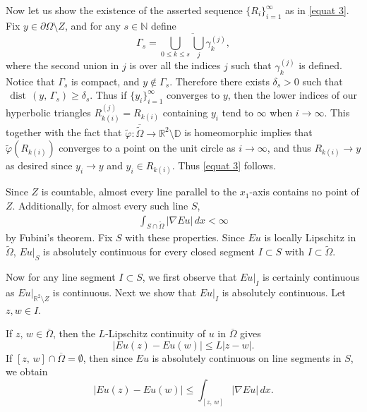 \documentclass[reqno,11pt]{amsart}
\def\dist{{\mathop\mathrm{\,dist\,}}}
\def\wz{\widetilde}
\numberwithin{equation}{section}
\theoremstyle{remark}
\begin{document}
Now let us show the existence of the asserted sequence $\{R_i\}_{i=1}^{\infty}$ as in \eqref{equat 3}. Fix $y\in \partial\Omega\setminus Z$, and for
any $s\in \mathbb N$ define
\begin{equation}\label{curve family}
\Gamma_s=\overline{\bigcup_{0\le k\le s} \bigcup_ j\gamma_k^{(j)}},
\end{equation}
where the second union in $j$ is over all the indices $j$ such that 
$\gamma_k^{(j)}$ is defined. Notice that $\Gamma_s$ is compact, 
and $y\not\in\Gamma_s$.
Therefore there exists $\delta_s>0$ such that $\dist(y,\,\Gamma_s)\ge\delta_s$. 
Thus if $\{y_i\}_{i=1}^{\infty}$ converges to $y$, then the lower indices 
of our hyperbolic triangles $R_{k(i)}^{(j)}=R_{k(i)}$ containing $y_i$ tend to 
$\infty$ when $i\to \infty.$  
This together with the fact that $\wz \varphi\colon \overline{\wz \Omega} 
\to \mathbb R^2\setminus \mathbb D$ is homeomorphic implies that $\wz \varphi(R_{k(i)})$ converges to a point on the unit circle  as $i\to \infty$, and thus $R_{k(i)} \to y$ as desired since $y_i\to y$ and $y_i\in R_{k(i)}$.
Thus  \eqref{equat 3} follows. 


Since $Z$ is countable, almost every line parallel to the $x_1$-axis contains 
no point of $Z$. Additionally, for almost every such line $S$,
\begin{eqnarray}\label{integrable}
\int_{S\cap \wz \Omega} |\nabla Eu|\, dx <\infty 
\end{eqnarray}
by Fubini's theorem. Fix $S$ with these properties. Since $Eu$ is  locally Lipschitz in $\wz \Omega$,   $Eu|_{S}$ is absolutely continuous for  every closed segment $I\subset S$   with $I\subset \wz \Omega$.


Now for any line segment $I\subset S$, we first observe that $Eu|_{I}$ is 
certainly continuous as $Eu|_{\mathbb R^2\setminus Z}$ is continuous. 
Next we show that $Eu|_{I}$ is absolutely continuous. 
Let $z,w\in I.$ 


If $z,\,w\in \overline{\Omega}$, then the $L$-Lipschitz continuity  
of $u$ in $\overline{\Omega}$ gives
\begin{equation}\label{eka}
|Eu(z)-Eu(w)|\le L|z-w|.
\end{equation}
If $[z,\,w] \cap \overline{\Omega} = \emptyset$, then since $Eu$ is 
absolutely continuous on line segments in $S$, we obtain 
\begin{equation}\label{toka}
|Eu(z)-Eu(w)|\le \int_{[z,\,w]} |\nabla Eu|\,dx.
\end{equation}
\end{document}

